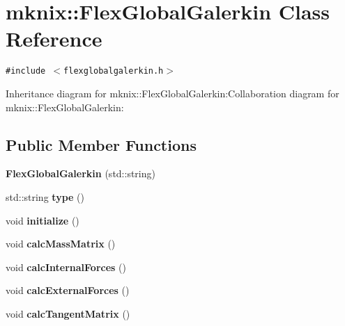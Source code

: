 \hypertarget{classmknix_1_1FlexGlobalGalerkin}{
\section{mknix::FlexGlobalGalerkin Class Reference}
\label{classmknix_1_1FlexGlobalGalerkin}
}
{\tt \#include $<$flexglobalgalerkin.h$>$}

Inheritance diagram for mknix::FlexGlobalGalerkin:Collaboration diagram for mknix::FlexGlobalGalerkin:\subsection*{Public Member Functions}
\begin{CompactItemize}
\item 
\hypertarget{classmknix_1_1FlexGlobalGalerkin_c6b6f20633619ffb6e1d6e7d5782659f}{
\textbf{FlexGlobalGalerkin} (std::string)}
\label{classmknix_1_1FlexGlobalGalerkin_c6b6f20633619ffb6e1d6e7d5782659f}

\item 
\hypertarget{classmknix_1_1FlexGlobalGalerkin_0232b0111e20c2e3cafa095ddd627ce9}{
std::string \textbf{type} ()}
\label{classmknix_1_1FlexGlobalGalerkin_0232b0111e20c2e3cafa095ddd627ce9}

\item 
\hypertarget{classmknix_1_1FlexGlobalGalerkin_24bad02ef3ea95123581550297ac82a0}{
void \textbf{initialize} ()}
\label{classmknix_1_1FlexGlobalGalerkin_24bad02ef3ea95123581550297ac82a0}

\item 
\hypertarget{classmknix_1_1FlexGlobalGalerkin_e5bb8c27e7494b233a96d971833a0d0d}{
void \textbf{calcMassMatrix} ()}
\label{classmknix_1_1FlexGlobalGalerkin_e5bb8c27e7494b233a96d971833a0d0d}

\item 
\hypertarget{classmknix_1_1FlexGlobalGalerkin_d9cbe937a3795ad5f9c5bd1990a14731}{
void \textbf{calcInternalForces} ()}
\label{classmknix_1_1FlexGlobalGalerkin_d9cbe937a3795ad5f9c5bd1990a14731}

\item 
\hypertarget{classmknix_1_1FlexGlobalGalerkin_2ed7079f0f2674c3556ff8dbbf3a63d3}{
void \textbf{calcExternalForces} ()}
\label{classmknix_1_1FlexGlobalGalerkin_2ed7079f0f2674c3556ff8dbbf3a63d3}

\item 
\hypertarget{classmknix_1_1FlexGlobalGalerkin_723916e65683c2ed77385ce0e3c3bd1a}{
void \textbf{calcTangentMatrix} ()}
\label{classmknix_1_1FlexGlobalGalerkin_723916e65683c2ed77385ce0e3c3bd1a}


\end{CompactItemize}
